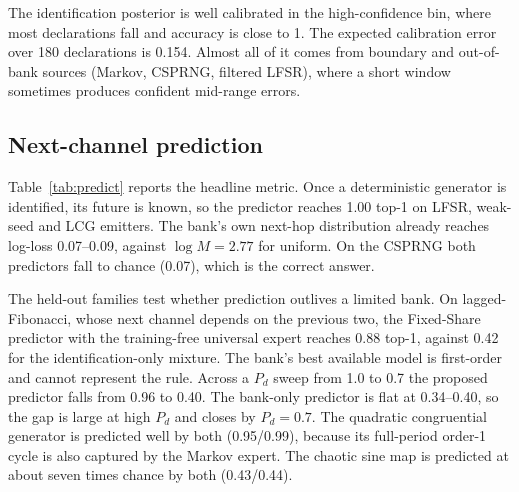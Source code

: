 The identification posterior is well calibrated in the high-confidence bin,
where most declarations fall and accuracy is close to 1. The expected
calibration error over 180 declarations is 0.154. Almost all of it comes from
boundary and out-of-bank sources (Markov, CSPRNG, filtered LFSR), where a short
window sometimes produces confident mid-range errors.

\subsection{Next-channel prediction}
\label{sec:res-predict}

Table~\ref{tab:predict} reports the headline metric. Once a deterministic
generator is identified, its future is known, so the predictor reaches 1.00
top-1 on LFSR, weak-seed and LCG emitters. The bank's own next-hop distribution
already reaches log-loss 0.07--0.09, against $\log M=2.77$ for uniform. On the
CSPRNG both predictors fall to chance (0.07), which is the correct answer.

The held-out families test whether prediction outlives a limited bank. On
lagged-Fibonacci, whose next channel depends on the previous two, the Fixed-Share
predictor with the training-free universal expert reaches 0.88 top-1, against
0.42 for the identification-only mixture. The bank's best available model is
first-order and cannot represent the rule. Across a $P_d$ sweep from 1.0 to 0.7
the proposed predictor falls from 0.96 to 0.40. The bank-only predictor is
flat at 0.34--0.40, so the gap is large at high $P_d$ and closes by
$P_d=0.7$.\stale{} The quadratic congruential generator is
predicted well by both (0.95/0.99), because its full-period order-1 cycle is
also captured by the Markov expert. The chaotic sine map is predicted at about
seven times chance by both (0.43/0.44).


